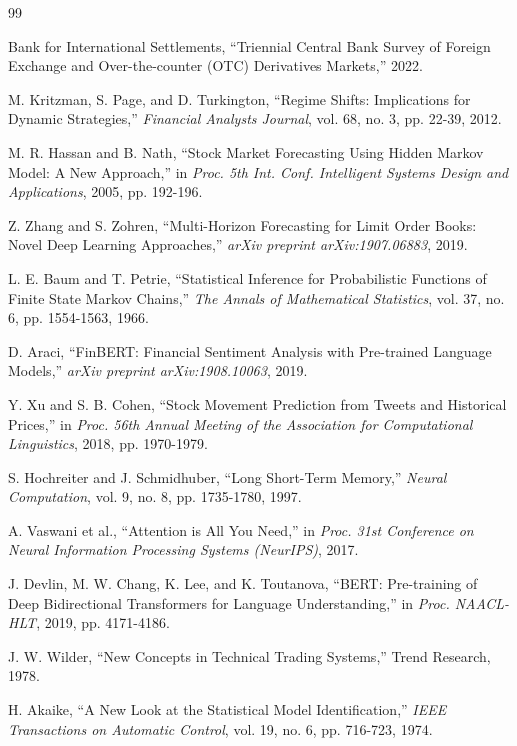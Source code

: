 \documentclass[conference]{IEEEtran}
\begin{document}
\begin{thebibliography}{99}

Bank for International Settlements, ``Triennial Central Bank Survey of Foreign Exchange and Over-the-counter (OTC) Derivatives Markets,'' 2022.

M. Kritzman, S. Page, and D. Turkington, ``Regime Shifts: Implications for Dynamic Strategies,'' \textit{Financial Analysts Journal}, vol. 68, no. 3, pp. 22-39, 2012.

M. R. Hassan and B. Nath, ``Stock Market Forecasting Using Hidden Markov Model: A New Approach,'' in \textit{Proc. 5th Int. Conf. Intelligent Systems Design and Applications}, 2005, pp. 192-196.

Z. Zhang and S. Zohren, ``Multi-Horizon Forecasting for Limit Order Books: Novel Deep Learning Approaches,'' \textit{arXiv preprint arXiv:1907.06883}, 2019.

L. E. Baum and T. Petrie, ``Statistical Inference for Probabilistic Functions of Finite State Markov Chains,'' \textit{The Annals of Mathematical Statistics}, vol. 37, no. 6, pp. 1554-1563, 1966.

D. Araci, ``FinBERT: Financial Sentiment Analysis with Pre-trained Language Models,'' \textit{arXiv preprint arXiv:1908.10063}, 2019.

Y. Xu and S. B. Cohen, ``Stock Movement Prediction from Tweets and Historical Prices,'' in \textit{Proc. 56th Annual Meeting of the Association for Computational Linguistics}, 2018, pp. 1970-1979.

S. Hochreiter and J. Schmidhuber, ``Long Short-Term Memory,'' \textit{Neural Computation}, vol. 9, no. 8, pp. 1735-1780, 1997.

A. Vaswani et al., ``Attention is All You Need,'' in \textit{Proc. 31st Conference on Neural Information Processing Systems (NeurIPS)}, 2017.

J. Devlin, M. W. Chang, K. Lee, and K. Toutanova, ``BERT: Pre-training of Deep Bidirectional Transformers for Language Understanding,'' in \textit{Proc. NAACL-HLT}, 2019, pp. 4171-4186.

J. W. Wilder, ``New Concepts in Technical Trading Systems,'' Trend Research, 1978.

H. Akaike, ``A New Look at the Statistical Model Identification,'' \textit{IEEE Transactions on Automatic Control}, vol. 19, no. 6, pp. 716-723, 1974.


\end{thebibliography}
\end{document}
